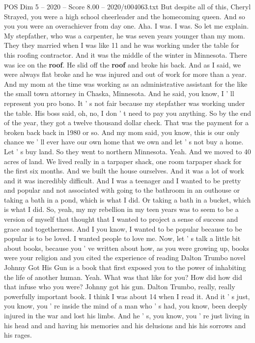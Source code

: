\begin{textsample}{POS Dim 5 – 2020 – Score 8.00 – 2020/t004063.txt}
But despite all of this, Cheryl Strayed, you were a high school cheerleader and the homecoming queen.
And so you you were an overachiever from day one.
Aha.
I was.
I was.
So let me explain.
My stepfather, who was a carpenter, he was seven years younger than my mom.
They they married when I was like 11 and he was working under the table for this roofing contractor.
And it was the middle of the winter in Minnesota.
There was ice on the \textbf{roof}.
He slid off the \textbf{roof} and broke his back.
And as I said, we were always flat broke and he was injured and out of work for more than a year.
And my mom at the time was working as an administrative assistant for the like the small town attorney in Chaska, Minnesota.
And he said, you know, I ' ll represent you pro bono.
It ' s not fair because my stepfather was working under the table.
His boss said, oh, no, I don ' t need to pay you anything.
So by the end of the year, they got a twelve thousand dollar check.
That was the payment for a broken back back in 1980 or so.
And my mom said, you know, this is our only chance we ' ll ever have our own home that we own and let ' s not buy a home.
Let ' s buy land.
So they went to northern Minnesota.
Yeah.
And we moved to 40 acres of land.
We lived really in a tarpaper shack, one room tarpaper shack for the first six months.
And we built the house ourselves.
And it was a lot of work and it was incredibly difficult.
And I was a teenager and I wanted to be pretty and popular and not associated with going to the bathroom in an outhouse or taking a bath in a pond, which is what I did.
Or taking a bath in a bucket, which is what I did.
So, yeah, my my rebellion in my teen years was to seem to be a version of myself that thought that I wanted to project a sense of success and grace and togetherness.
And I you know, I wanted to be popular because to be popular is to be loved.
I wanted people to love me.
Now, let ' s talk a little bit about books, because you ' ve written about how, as you were growing up, books were your religion and you cited the experience of reading Dalton Trumbo novel Johnny Got His Gun is a book that first exposed you to the power of inhabiting the life of another human.
Yeah.
What was that like for you?
How did how did that infuse who you were?
Johnny got his gun.
Dalton Trumbo, really, really powerfully important book.
I think I was about 14 when I read it.
And it ' s just, you know, you ' re inside the mind of a man who ' s had, you know, been deeply injured in the war and lost his limbs.
And he ' s, you know, you ' re just living in his head and and having his memories and his delusions and his his sorrows and his rages.

\end{textsample}
